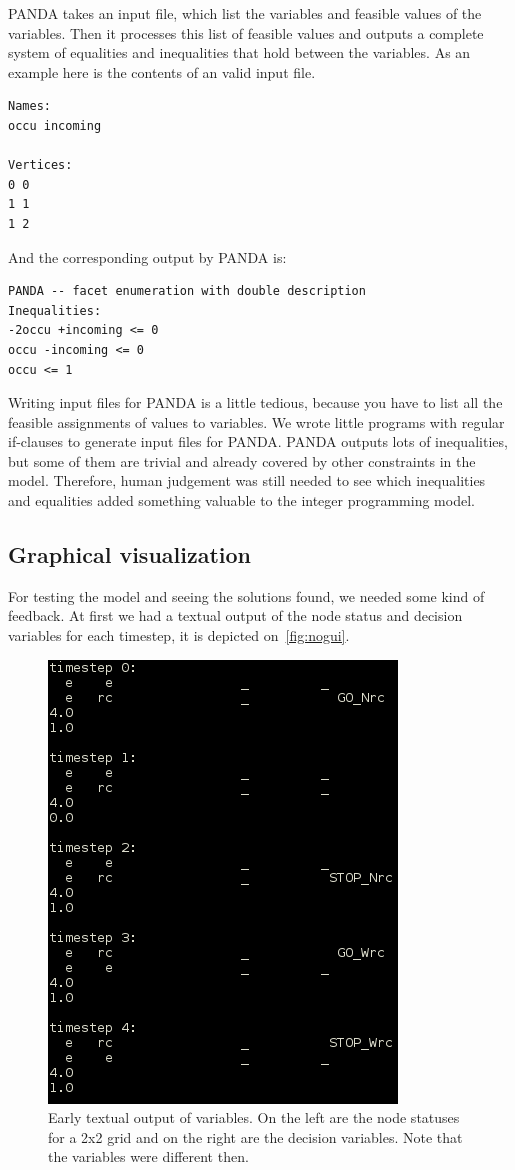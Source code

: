 PANDA takes an input file, which list the variables and feasible values of the
variables. Then it processes this list of feasible values and outputs a
complete system of equalities and inequalities that hold between the variables.
As an example here is the contents of an valid input file.
\begin{verbatim}
Names:
occu incoming

Vertices:
0 0
1 1
1 2
\end{verbatim}
And the corresponding output by PANDA is:
\begin{verbatim}
PANDA -- facet enumeration with double description
Inequalities:
-2occu +incoming <= 0
occu -incoming <= 0
occu <= 1
\end{verbatim}

Writing input files for PANDA is a little tedious, because you have to list all
the feasible assignments of values to variables. We wrote little programs with
regular if-clauses to generate input files for PANDA. PANDA outputs lots of
inequalities, but some of them are trivial and already covered by other
constraints in the model. Therefore, human judgement was still needed to see
which inequalities and equalities added something valuable to the integer
programming model.
\subsection{Graphical visualization}
For testing the model and seeing the solutions found, we needed some kind of
feedback. At first we had a textual output of the node status and decision
variables for each timestep, it is depicted on~\autoref{fig:nogui}.

\begin{figure}[h]
    \begin{center}
	\includegraphics[scale=0.7]{fig/nogui.png}
        \caption{Early textual output of variables. On the left are the node
            statuses for a 2x2 grid and on the right are the decision variables.
        Note that the variables were different then.}
        \label{fig:nogui}
    \end{center}
\end{figure}

